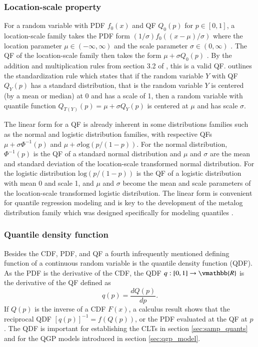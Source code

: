 \documentclass[preprint,12pt,authoryear]{elsarticle}
\begin{document}
\subsubsection{Location-scale property}
For a random variable with PDF $f_0(x)$ and QF $Q_0(p)$ for $p\in [0,1]$, a location-scale family takes the PDF form $(1/\sigma)f_0((x - \mu)/\sigma)$ where the location parameter $\mu \in (-\infty, \infty)$ and the scale parameter $\sigma \in (0, \infty)$ \cite[]{casella2002statistical}. The QF of the location-scale family then takes the form $\mu + \sigma Q_0(p)$ \cite[]{parzen2004quantile}. By the addition and multiplication rules from section 3.2 of \cite{gilchrist2000statistical}, 
this is a valid QF. \cite{gilchrist2000statistical} outlines the standardization rule which states that if the random variable $Y$ with QF $Q_Y(p)$ has a standard distribution, that is the random variable $Y$ is centered (by a mean or median) at 0 and has a scale of 1, then a random variable with quantile function $Q_{T(Y)}(p) = \mu + \sigma Q_Y(p)$ is centered at $\mu$ and has scale $\sigma$.

The linear form for a QF is already inherent in some distributions families such as the normal and logistic distribution families, with respective QFs $\mu + \sigma \Phi^{-1} (p)$ and $\mu + \sigma \text{log}(p/(1 - p))$. For the normal distribution, $\Phi^{-1}(p)$ is the QF of a standard normal distribution and $\mu$ and $\sigma$ are the mean and standard deviation of the location-scale transformed normal distribution. For the logistic distribution $\text{log}(p/(1-p))$ is the QF of a logistic distribution with mean 0 and scale 1, and $\mu$ and $\sigma$ become the mean and scale parameters of the location-scale transformed logistic distribution. The linear form is convenient for quantile regression modeling and is key to the development of the metalog distribution family which was designed specifically for modeling quantiles \cite[]{keelin2016metalog}. 

\subsubsection{Quantile density function}

Besides the CDF, PDF, and QF a  fourth infrequently mentioned defining function of a continuous random variable is the quantile density function (QDF). As the PDF is the derivative of the CDF, the QDF $q:[0,1] \rightarrow \vmathbb{R}$ is the derivative of the QF defined as
\[
    q(p) = \frac{dQ(p)}{dp}.
\]
If $Q(p)$ is the inverse of a CDF $F(x)$, a calculus result shows that the reciprocal QDF $[q(p)]^{-1} = f(Q(p))$, or the PDF evaluated at the QF at $p$ \cite[]{perepolkin2023tenets, gilchrist2000statistical}. The QDF is important for establishing the CLTs in section \ref{sec:samp_quants} and for the QGP models introduced in section \ref{sec:qgp_model}.
\end{document}
